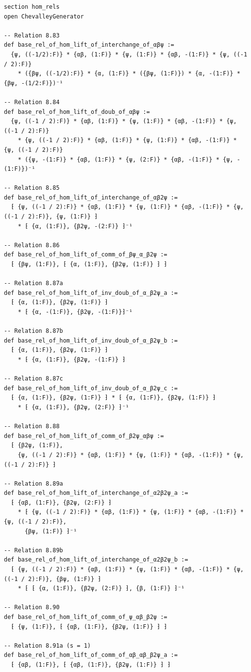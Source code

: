 \begin{Verbatim}
section hom_rels
open ChevalleyGenerator

-- Relation 8.83
def base_rel_of_hom_lift_of_interchange_of_αβψ :=
  {ψ, ((-1/2):F)} * {αβ, (1:F)} * {ψ, (1:F)} * {αβ, -(1:F)} * {ψ, ((-1 / 2):F)}
    * ({βψ, ((-1/2):F)} * {α, (1:F)} * ({βψ, (1:F)}) * {α, -(1:F)} * {βψ, -(1/2:F)})⁻¹

-- Relation 8.84
def base_rel_of_hom_lift_of_doub_of_αβψ :=
  {ψ, ((-1 / 2):F)} * {αβ, (1:F)} * {ψ, (1:F)} * {αβ, -(1:F)} * {ψ, ((-1 / 2):F)}
    * {ψ, ((-1 / 2):F)} * {αβ, (1:F)} * {ψ, (1:F)} * {αβ, -(1:F)} * {ψ, ((-1 / 2):F)}
    * ({ψ, -(1:F)} * {αβ, (1:F)} * {ψ, (2:F)} * {αβ, -(1:F)} * {ψ, -(1:F)})⁻¹

-- Relation 8.85
def base_rel_of_hom_lift_of_interchange_of_αβ2ψ :=
  ⁅ {ψ, ((-1 / 2):F)} * {αβ, (1:F)} * {ψ, (1:F)} * {αβ, -(1:F)} * {ψ, ((-1 / 2):F)}, {ψ, (1:F)} ⁆
    * ⁅ {α, (1:F)}, {β2ψ, -(2:F)} ⁆⁻¹

-- Relation 8.86
def base_rel_of_hom_lift_of_comm_of_βψ_α_β2ψ :=
  ⁅ {βψ, (1:F)}, ⁅ {α, (1:F)}, {β2ψ, (1:F)} ⁆ ⁆

-- Relation 8.87a
def base_rel_of_hom_lift_of_inv_doub_of_α_β2ψ_a :=
  ⁅ {α, (1:F)}, {β2ψ, (1:F)} ⁆
    * ⁅ {α, -(1:F)}, {β2ψ, -(1:F)}⁆⁻¹

-- Relation 8.87b
def base_rel_of_hom_lift_of_inv_doub_of_α_β2ψ_b :=
  ⁅ {α, (1:F)}, {β2ψ, (1:F)} ⁆
    * ⁅ {α, (1:F)}, {β2ψ, -(1:F)} ⁆

-- Relation 8.87c
def base_rel_of_hom_lift_of_inv_doub_of_α_β2ψ_c :=
  ⁅ {α, (1:F)}, {β2ψ, (1:F)} ⁆ * ⁅ {α, (1:F)}, {β2ψ, (1:F)} ⁆
    * ⁅ {α, (1:F)}, {β2ψ, (2:F)} ⁆⁻¹

-- Relation 8.88
def base_rel_of_hom_lift_of_comm_of_β2ψ_αβψ :=
  ⁅ {β2ψ, (1:F)},
    {ψ, ((-1 / 2):F)} * {αβ, (1:F)} * {ψ, (1:F)} * {αβ, -(1:F)} * {ψ, ((-1 / 2):F)} ⁆

-- Relation 8.89a
def base_rel_of_hom_lift_of_interchange_of_α2β2ψ_a :=
  ⁅ {αβ, (1:F)}, {β2ψ, (2:F)} ⁆
    * ⁅ {ψ, ((-1 / 2):F)} * {αβ, (1:F)} * {ψ, (1:F)} * {αβ, -(1:F)} * {ψ, ((-1 / 2):F)},
      {βψ, (1:F)} ⁆⁻¹

-- Relation 8.89b
def base_rel_of_hom_lift_of_interchange_of_α2β2ψ_b :=
  ⁅ {ψ, ((-1 / 2):F)} * {αβ, (1:F)} * {ψ, (1:F)} * {αβ, -(1:F)} * {ψ, ((-1 / 2):F)}, {βψ, (1:F)} ⁆
    * ⁅ ⁅ {α, (1:F)}, {β2ψ, (2:F)} ⁆, {β, (1:F)} ⁆⁻¹

-- Relation 8.90
def base_rel_of_hom_lift_of_comm_of_ψ_αβ_β2ψ :=
  ⁅ {ψ, (1:F)}, ⁅ {αβ, (1:F)}, {β2ψ, (1:F)} ⁆ ⁆

-- Relation 8.91a (s = 1)
def base_rel_of_hom_lift_of_comm_of_αβ_αβ_β2ψ_a :=
  ⁅ {αβ, (1:F)}, ⁅ {αβ, (1:F)}, {β2ψ, (1:F)} ⁆ ⁆


\end{Verbatim}
